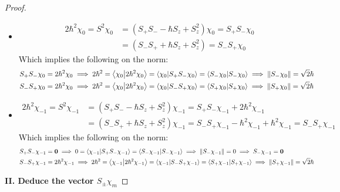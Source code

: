 \documentclass{article}
\begin{document}
\begin{proof}
\begin{itemize}
\begin{align}
            &S_-S_+\chi_1 = \bzero \implies 0 = \braket{\chi_1}{S_-S_+\chi_1} = \braket{S_+\chi_1}{S_+\chi_1} \implies \|S_+\chi_1\| = 0\implies S_+\chi_1 = \bzero
        \end{align}
        \item[$\chi_0$:]
        \begin{align}
            2\hbar^2 \chi_0 = S^2\chi_0 &= (S_+S_- - \hbar S_z + S_z^2)\chi_0 = S_+S_- \chi_0\\
            &= (S_-S_+ + \hbar S_z + S_z^2) = S_-S_+\chi_0
        \end{align}
        Which implies the following on the norm:
        \begin{align}
            &S_+S_-\chi_0 = 2\hbar^2\chi_0 \implies 2\hbar^2 = \braket{\chi_0}{2\hbar^2\chi_0} = \braket{\chi_0}{S_+S_-\chi_0} = \braket{S_-\chi_0}{S_-\chi_0} \implies \|S_-\chi_0\| = \sqrt{2}\hbar\\
            &S_-S_+\chi_0 = 2\hbar^2\chi_0 \implies 2\hbar^2 = \braket{\chi_0}{2\hbar^2\chi_0} = \braket{\chi_0}{S_-S_+\chi_0} = \braket{S_+\chi_0}{S_+\chi_0} \implies \|S_+\chi_0\| = \sqrt{2}\hbar
        \end{align}
        \item[$\chi_{-1}$:] 
        \begin{align}
            2\hbar^2\chi_{-1} = S^2\chi_{-1} &= (S_+S_--\hbar S_z+S_z^2)\chi_{-1} = S_+S_-\chi_{-1} + 2\hbar^2\chi_{-1}\\
            &= (S_-S_++\hbar S_z+S_z^2)\chi_{-1} = S_-S_+\chi_{-1}-\hbar^2\chi_{-1}+\hbar^2\chi_{-1} = S_-S_+\chi_{-1}
        \end{align}
        Which implies the following on the norm:
        \begin{align}
            &S_+S_-\chi_{-1}=\mathbf{0} \implies 0=\braket{\chi_{-1}}{S_+S_-\chi_{-1}} = \braket{S_-\chi_{-1}}{S_-\chi_{-1}} \implies \|S_-\chi_{-1}\|= 0\implies S_-\chi_{-1}=\mathbf{0}\\
            &S_-S_+\chi_{-1} = 2\hbar^2\chi_{-1}\implies 2\hbar^2=\braket{\chi_{-1}}{2\hbar^2\chi_{-1}} = \braket{\chi_{-1}}{S_-S_+\chi_{-1}} = \braket{S_+\chi_{-1}}{S_+\chi_{-1}}\implies \|S_+\chi_{-1}\| = \sqrt{2}\hbar
        \end{align}
    \end{itemize}

    \hfil

    \textbf{II. Deduce the vector $S_\pm \chi_m$}


\end{proof}
\end{document}
